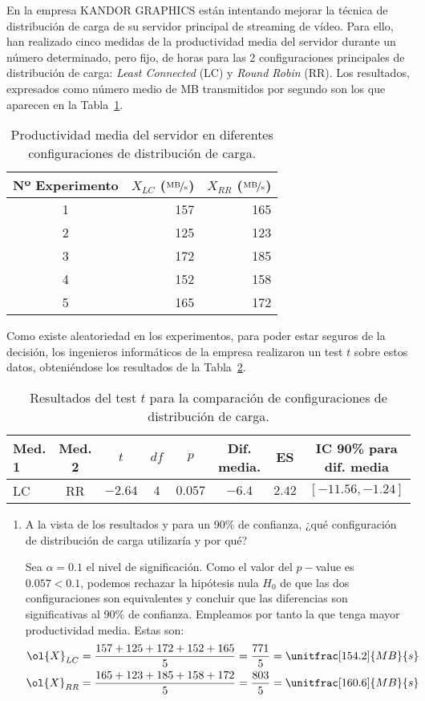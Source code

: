 \begin{ejercicio}\label{ej:4.15}
En la empresa KANDOR GRAPHICS están intentando mejorar la técnica de distribución de carga de su servidor principal de streaming de vídeo. Para ello, han realizado cinco medidas de la productividad media del servidor durante un número determinado, pero fijo, de horas para las 2 configuraciones principales de distribución de carga: \emph{Least Connected} (LC) y \emph{Round Robin} (RR). Los resultados, expresados como número medio de MB transmitidos por segundo son los que aparecen en la Tabla~\ref{tab:ej:4.15_1}.
\begin{table}[h]
\centering
\begin{tabular}{@{}crr@{}}
\toprule
Nº Experimento & $X_{LC}$ ($\nicefrac{\text{MB}}{\text{s}}$) & $X_{RR}$ ($\nicefrac{\text{MB}}{\text{s}}$) \\ \midrule
1 & 157 & 165 \\
2 & 125 & 123 \\
3 & 172 & 185 \\
4 & 152 & 158 \\
5 & 165 & 172 \\ \bottomrule
\end{tabular}
\caption{\centering Productividad media del servidor en diferentes configuraciones de distribución de carga.}
\label{tab:ej:4.15_1}
\end{table}
Como existe aleatoriedad en los experimentos, para poder estar seguros de la decisión, los ingenieros informáticos de la empresa realizaron un test $t$ sobre estos datos, obteniéndose los resultados de la Tabla~\ref{tab:ej:4.15_2}.
\begin{table}[h]
\centering
\begin{tabular}{@{}lccccccc@{}}
\toprule
Med. 1 & Med. 2 & $t$ & $df$ & $p$ & Dif. media. & ES & IC 90\% para dif. media \\ \midrule
LC & RR & $-2.64$ & $4$ & $0.057$ & $-6.4$ & $2.42$ & $[-11.56, -1.24]$ \\ \bottomrule
\end{tabular}
\caption{\centering Resultados del test $t$ para la comparación de configuraciones de distribución de carga.}
\label{tab:ej:4.15_2}
\end{table}
\begin{enumerate}
    \item A la vista de los resultados y para un 90\% de confianza, ¿qué configuración de distribución de carga utilizaría y por qué?
    
    Sea $\alpha=0.1$ el nivel de significación. Como el valor del $p-$value es $0.057<0.1$, podemos rechazar la hipótesis nula $H_0$ de que las dos configuraciones son equivalentes y concluir que las diferencias son significativas al 90\% de confianza. Empleamos por tanto la que tenga mayor productividad media. Estas son:
    \begin{align*}
        \ol{X}_{LC} &= \dfrac{157 + 125 + 172 + 152 + 165}{5} = \dfrac{771}{5} = \unitfrac[154.2]{MB}{s}\\
        \ol{X}_{RR} &= \dfrac{165 + 123 + 185 + 158 + 172}{5} = \dfrac{803}{5} = \unitfrac[160.6]{MB}{s}
    \end{align*}


\end{enumerate}
\end{ejercicio}
